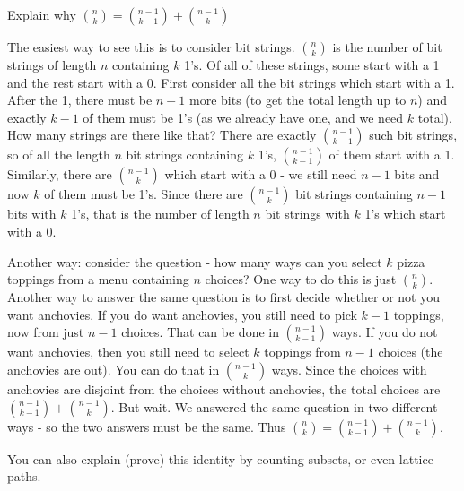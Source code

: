 \documentclass[12pt]{article}
\begin{document}
\begin{example}
  Explain why ${n \choose k} = {n-1 \choose k-1} + {n-1 \choose k}$
  \begin{solution}
    The easiest way to see this is to consider bit strings.  ${n \choose k}$ is the number of bit strings of length $n$ containing $k$ 1's.  Of all of these strings, some start with a 1 and the rest start with a 0.  First consider all the bit strings which start with a 1.  After the 1, there must be $n-1$ more bits (to get the total length up to $n$) and exactly $k-1$ of them must be 1's (as we already have one, and we need $k$ total).  How many strings are there like that?  There are exactly ${n-1 \choose k-1}$ such bit strings, so of all the length $n$ bit strings containing $k$ 1's, ${n-1 \choose k-1}$ of them start with a 1.  Similarly, there are ${n-1\choose k}$ which start with a 0 - we still need $n-1$ bits and now $k$ of them must be 1's.  Since there are ${n-1 \choose k}$ bit strings containing $n-1$ bits with $k$ 1's, that is the number of length $n$ bit strings with $k$ 1's which start with a 0.
    
    Another way: consider the question - how many ways can you select $k$ pizza toppings from a menu containing $n$ choices?  One way to do this is just ${n \choose k}$.  Another way to answer the same question is to first decide whether or not you want anchovies.  If you do want anchovies, you still need to pick $k-1$ toppings, now from just $n-1$ choices.  That can be done in ${n-1 \choose k-1}$ ways.  If you do not want anchovies, then you still need to select $k$ toppings from $n-1$ choices (the anchovies are out).  You can do that in ${n-1 \choose k}$ ways.  Since the choices with anchovies are disjoint from the choices without anchovies, the total choices are ${n-1 \choose k-1}+{n-1 \choose k}$.  But wait.  We answered the same question in two different ways - so the two answers must be the same.  Thus ${n \choose k} = {n-1\choose k-1} + {n-1 \choose k}$.
    
    You can also explain (prove) this identity by counting subsets, or even lattice paths.
  \end{solution}

\end{example}
\end{document}

